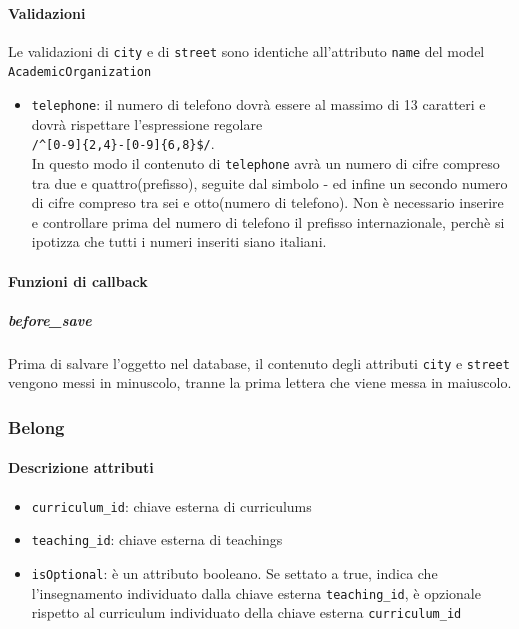 \documentclass[11pt,a4paper]{article}
\begin{document}
\paragraph{Validazioni}
Le validazioni di \verb|city| e di \verb|street| sono identiche all'attributo \verb|name| del model \verb|AcademicOrganization|
\begin{itemize}
 \item \verb|telephone|: il numero di telefono dovrà essere al massimo di 13 caratteri e dovrà rispettare l'espressione regolare\\
 \verb|/^[0-9]{2,4}-[0-9]{6,8}$/|.\\  
In questo modo il contenuto di \verb|telephone| avrà un numero di cifre compreso tra due e quattro(prefisso), seguite dal simbolo - ed infine un secondo numero di cifre compreso tra sei e otto(numero di telefono). Non è necessario inserire e controllare prima del numero di telefono il prefisso internazionale, perchè si ipotizza che tutti i numeri inseriti siano italiani.
\end{itemize}
\paragraph{Funzioni di callback}
\subparagraph{before\_save}
Prima di salvare l'oggetto nel database, il contenuto degli attributi \verb|city| e \verb|street| vengono messi in minuscolo, tranne la prima lettera che viene messa in maiuscolo.
\subsubsection{Belong}
\paragraph{Descrizione attributi}
\begin{itemize}
 \item \verb|curriculum_id|: chiave esterna di curriculums
 \item \verb|teaching_id|: chiave esterna di teachings
 \item \verb|isOptional|: è un attributo booleano. Se settato a true, indica che l'insegnamento individuato dalla chiave esterna \verb|teaching_id|, è opzionale rispetto al curriculum individuato della chiave esterna \verb|curriculum_id|	
\end{itemize}
\end{document}
